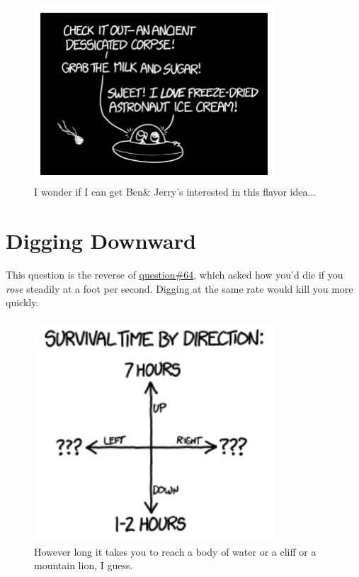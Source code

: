 {\begin{figure}[!htbp]
\centering
\includegraphics[scale=0.5, max width=0.8\textwidth]{imgs/a/134/ice.png}
\caption{I wonder if I can get Ben\& Jerry's interested in this flavor idea...}
\end{figure}

{
\chapter{Digging Downward}
}

\hfill{}

{This question is the reverse of \href{http://what-if.xkcd.com/64/}{question\#64}, which asked how you'd die if you \emph{rose} steadily at a foot per second. Digging at the same rate would kill you more quickly.}

\begin{figure}[!htbp]
\centering
\includegraphics[scale=0.5, max width=0.8\textwidth]{imgs/a/135/kill.png}
\caption{However long it takes you to reach a body of water or a cliff or a mountain lion, I guess.}
\end{figure}

}
